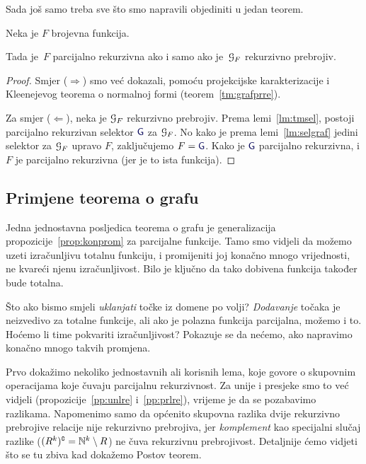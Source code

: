 Sada još samo treba sve što smo napravili objediniti u jedan teorem.

\begin{teorem}\label{tm:graf}
Neka je $F$ brojevna funkcija.

Tada je \,$F$ parcijalno rekurzivna ako i samo ako je \,$\mathcal G_{F}$ rekurzivno prebrojiv.
\end{teorem}
\begin{proof}
Smjer ($\Rightarrow$) smo već dokazali, pomoću projekcijske karakterizacije i Kleenejevog teorema o normalnoj formi (teorem~\ref{tm:grafprre}).

Za smjer ($\Leftarrow$), neka je $\mathcal G_{F}$ rekurzivno prebrojiv. Prema lemi~\ref{lm:tmsel}, postoji parcijalno rekurzivan selektor $\f G$ za $\mathcal G_{F}$. No kako je prema lemi~\ref{lm:selgraf} jedini selektor za $\mathcal G_{F}$ upravo $F$, zaključujemo $F=\f G$. Kako je $\f G$ parcijalno rekurzivna, i $F$ je parcijalno rekurzivna (jer je to ista funkcija).
\end{proof}

\subsection{Primjene teorema o grafu}

Jedna jednostavna posljedica teorema o grafu je generalizacija propozicije~\ref{prop:konprom} za parcijalne funkcije. Tamo smo vidjeli da možemo uzeti izračunljivu totalnu funkciju, i promijeniti joj konačno mnogo vrijednosti, ne kvareći njenu izračunljivost. Bilo je ključno da tako dobivena funkcija također bude totalna.

Što ako bismo smjeli \emph{uklanjati} točke iz domene po volji? \emph{Dodavanje} točaka je neizvedivo za totalne funkcije, ali ako je polazna funkcija parcijalna, možemo i to. Hoćemo li time pokvariti izračunljivost? Pokazuje se da nećemo, ako napravimo konačno mnogo takvih promjena.

Prvo dokažimo nekoliko jednostavnih ali korisnih lema, koje govore o skupovnim operacijama koje čuvaju parcijalnu rekurzivnost. Za unije i presjeke smo to već vidjeli (propozicije~\ref{pp:unlre} i~\ref{pp:prlre}), vrijeme je da se pozabavimo razlikama. Napomenimo samo da općenito skupovna razlika dvije rekurzivno prebrojive relacije nije rekurzivno prebrojiva, jer \emph{komplement} kao specijalni slučaj razlike ($(R^k)\sp{{\scriptscriptstyle\complement}}={\mathbb N}^k\setminus R$) ne čuva rekurzivnu prebrojivost. Detaljnije ćemo vidjeti što se tu zbiva kad dokažemo Postov teorem.

